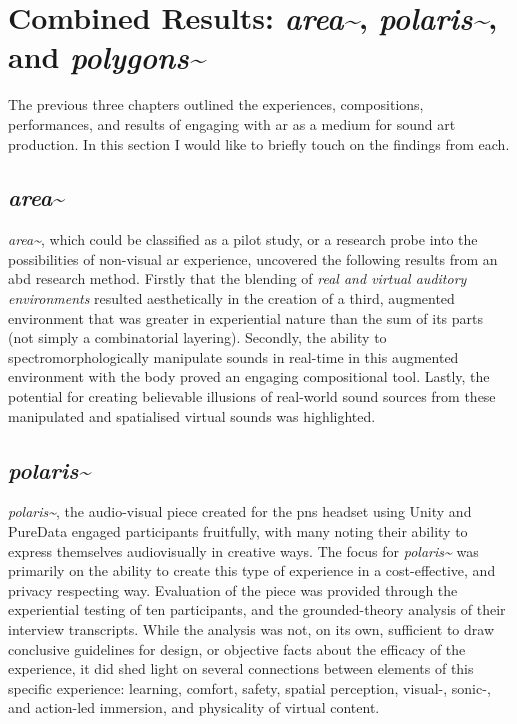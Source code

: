 \section{Combined Results: \textit{area\textasciitilde{}}, \textit{polaris\textasciitilde{}}, and \textit{polygons\textasciitilde{}}}\label{sec: discussion-medium}

The previous three chapters outlined the experiences, compositions, performances, and results of engaging with \gls{ar} as a medium for sound \gls{art} production. In this section I would like to briefly touch on the findings from each.

\subsection{\textit{area\textasciitilde{}}}
\textit{area\textasciitilde{}}, which could be classified as a pilot study, or a research probe into the possibilities of non-visual \gls{ar} experience, uncovered the following results from an \gls{abd} research method. Firstly that the blending of \textit{real and virtual auditory environments} resulted aesthetically in the creation of a third, augmented environment that was greater in experiential nature than the sum of its parts (not simply a combinatorial layering). Secondly, the ability to spectromorphologically manipulate sounds in real-time in this augmented environment with the body proved an engaging compositional tool. Lastly, the potential for creating believable illusions of real-world sound sources from these manipulated and spatialised virtual sounds was highlighted.

\subsection{\textit{polaris\textasciitilde{}}}
\textit{polaris\textasciitilde{}}, the audio-visual piece created for the \gls{pns} headset using Unity and PureData engaged participants fruitfully, with many noting their ability to express themselves audiovisually in creative ways. The focus for \textit{polaris\textasciitilde{}} was primarily on the ability to create this type of experience in a cost-effective, and privacy respecting way. Evaluation of the piece was provided through the experiential testing of ten participants, and the grounded-theory analysis of their interview transcripts. While the analysis was not, on its own, sufficient to draw conclusive guidelines for design, or objective facts about the efficacy of the experience, it did shed light on several connections between elements of this specific experience: learning, comfort, safety, spatial perception, visual-, sonic-, and action-led immersion, and physicality of virtual content.

